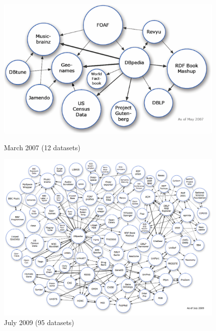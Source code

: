 \begin{figure}[t]
{}
\begin{minipage}{.5\textwidth}
  \centering
  \includegraphics[width=\linewidth]{Figures/LOD/lod-cloud_2007.png}
  \caption*{March 2007 (12 datasets)}
  \label{fig:test1}
\end{minipage}%
\hspace{0.5cm}
\begin{minipage}{.5\textwidth}
  \includegraphics[width=\linewidth]{Figures/LOD/lod-cloud_2009.png}
  \caption*{July 2009 (95 datasets)}
  \label{fig:test2}
\end{minipage}
\end{figure}
\vspace{5cm}
